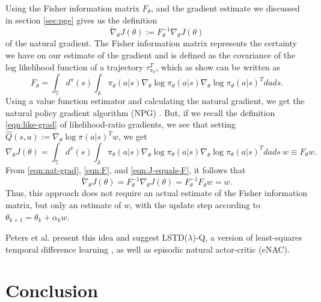 Using the Fisher information matrix $F_\theta$, and the gradient estimate we discussed in section \ref{sec:pge} gives us the definition
\begin{equation}
  \widetilde{\nabla}_\theta J(\theta) := F^{-1}_\theta \nabla_\theta J(\theta)
  \label{eqn:nat-grad}
\end{equation}
of the natural gradient. 
The Fisher information matrix represents the certainty we have on our estimate of the gradient and is defined as the covariance of the log likelihood function of a trajectory $\tau_{\pi_\theta}^T$, which as \cite{4863} show can be written as 
\begin{equation}
  F_\theta = \int_\mathbb{S} d^\pi(s) \int_\mathbb{A} \pi_\theta(a|s) \nabla_\theta \log{\pi_\theta(a|s)} \nabla_\theta \log{\pi_\theta(a|s)}^T dads.
  \label{eqn:F}
\end{equation}
Using a value function estimator and calculating the natural gradient, we get the natural policy gradient algorithm (NPG) \cite{NIPS2017_7233}.
But, if we recall the definition \eqref{eqn:like-grad} of likelihood-ratio gradients, we see that setting $\hat{Q}(s,a) := \nabla_\theta \log \pi(a|s)^T w$, we get
\begin{equation}
  \nabla_\theta J(\theta) = \int_\mathbb{S} {d^\pi(s) \int_\mathbb{A} \pi_\theta(a|s) \nabla_\theta \log \pi_\theta(a|s) {\nabla_\theta \log \pi_\theta(a|s)}^T dads}\ w \equiv F_\theta w.
  \label{eqn:J-equals-F}
\end{equation}
From \eqref{eqn:nat-grad}, \eqref{eqn:F}, and \eqref{eqn:J-equals-F}, it follows that
\begin{equation}
  \widetilde{\nabla}_\theta J(\theta) = F^{-1}_\theta \nabla_\theta J(\theta) = F_\theta^{-1} F_\theta w = w.
\end{equation}
Thus, this approach does not require an actual estimate of the Fisher information matrix, but only an estimate of $w$, with the update step according to $\theta_{k+1} = \theta_k + \alpha_k w$.

Peters et al. \cite{4863} present this idea and suggest LSTD($\lambda$)-Q, a version of least-squares temporal difference learning  \cite{Boyan:1999:LTD:645528.657618}, as well as episodic natural actor-critic (eNAC).

\section{Conclusion}
\label{sec:outro}

